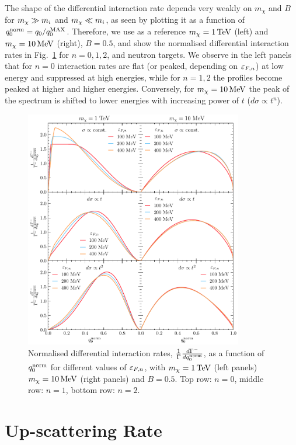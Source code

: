 The shape of the differential interaction rate depends very weakly on $m_\chi$ and $B$ for $m_\chi\gg m_i$ and $m_\chi \ll m_i$, as seen by plotting it as a function of $q_0^{\rm norm}=q_0/q_0^{\rm MAX}$. Therefore, we use as a reference $m_\chi=1{\rm \,TeV}$ (left) and $m_\chi=10{\rm \,MeV}$ (right),  $B=0.5$, and show the normalised differential interaction rates in Fig.~\ref{app:fig:diffgamma} for $n=0,1,2$, and neutron targets.
We observe in the left panels that for $n=0$ interaction rates are flat (or peaked, depending on $\varepsilon_{F,n}$) at low energy and suppressed at high energies, while for $n=1,2$ the profiles become peaked at higher and higher energies. Conversely, for $m_\chi=10{\rm \,MeV}$ the peak of the spectrum is shifted to lower energies with increasing power of $t$ ($d\sigma\propto t^n$).

\begin{figure}
    \centering
    \includegraphics[width = 0.85\textwidth]{img/capture_intro/capture_1/norm_diff_intrate_n.pdf}
    \caption{Normalised differential interaction rates, $\frac{1}{\Gamma}\frac{d\Gamma^-}{dq_0^{\rm norm}}$, as a function of $q_0^{\rm norm}$ for different values of $\varepsilon_{F,n}$, with $m_\chi=1{\rm \,TeV}$ (left panels) $m_\chi=10{\rm \,MeV}$ (right panels) and $B=0.5$. Top row: $n=0$, middle row: $n=1$, bottom row: $n=2$.}
    \label{app:fig:diffgamma}
\end{figure}

\section{Up-scattering Rate}
\label{app:subsec:up_scatter_derivation}

